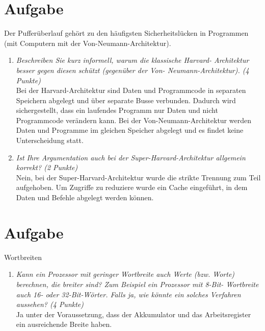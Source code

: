 \documentclass[10pt]{article}
\begin{document}
\section{Aufgabe}
Der Pufferüberlauf gehört zu den häufigsten Sicherheitslücken in Programmen (mit Computern mit der Von-Neumann-Architektur).
\begin{enumerate}[label=\alph*)]
	\item 
	\textit{Beschreiben Sie kurz informell, warum die klassische Harvard- Architektur besser gegen diesen schützt (gegenüber der Von- Neumann-Architektur). (4 Punkte)} \\
	Bei der Harvard-Architektur sind Daten und Programmcode in separaten Speichern abgelegt und über separate Busse verbunden. Dadurch wird sichergestellt, dass ein laufendes Programm nur Daten und nicht Programmcode verändern kann. Bei der Von-Neumann-Architektur werden Daten und Programme im gleichen Speicher abgelegt und es findet keine Unterscheidung statt.
	\item
	\textit{Ist Ihre Argumentation auch bei der Super-Harvard-Architektur allgemein korrekt? (2 Punkte)} \\
	Nein, bei der Super-Harvard-Architektur wurde die strikte Trennung zum Teil aufgehoben. Um Zugriffe zu reduziere wurde ein Cache eingeführt, in dem
	Daten und Befehle abgelegt werden können.
	
\end{enumerate}


\section{Aufgabe}
Wortbreiten
\begin{enumerate}[label=\alph*)]
	\item 
	\textit{Kann ein Prozessor mit geringer Wortbreite auch Werte (bzw. Worte) berechnen, die breiter sind? Zum Beispiel ein Prozessor mit 8-Bit- Wortbreite auch 16- oder 32-Bit-Wörter. Falls ja, wie könnte ein solches Verfahren aussehen? (4 Punkte)} \\
	Ja unter der Voraussetzung, dass der Akkumulator und das Arbeitsregister ein ausreichende Breite haben.
\end{enumerate}
\newpage





\end{document}
